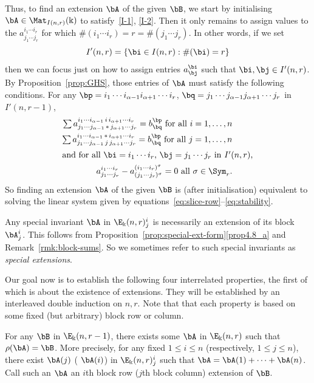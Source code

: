 Thus, to find an extension $\bA$ of the given $\bB$, we start by
initialising $\bA \in \Mat_{I(n,r)}(\Bbbk)$ to satisfy~\eqref{I-1},
\eqref{I-2}. Then it only remains to assign values to the $a^{i_1 \cdots
 i_r}_{j_1 \cdots j_r}$ for which $\#(i_1 \cdots i_r) = r = \#(j_1
\cdots j_r)$. In other words, if we set
\[
I'(n,r) = \{\bi \in I(n,r): \#(\bi) = r\}
\]
then we can focus just on how to assign entries $a^\bi_\bj$ such that
$\bi,\bj \in I'(n,r)$. By Proposition~\ref{prop:GHS}, those entries of
$\bA$ must satisfy the following conditions. For any $\bp = i_1
\cdots i_{\alpha-1} i_{\alpha+1} \cdots i_r$, $\bq = j_1 \cdots
j_{\alpha-1} j_{\alpha+1} \cdots j_r$ in $I'(n,r-1)$,
\begin{align}
\textstyle \sum a^{i_1\cdots i_{\alpha-1} \, i
 \, i_{\alpha+1}\cdots i_r}_{j_1\cdots j_{\alpha-1} \,*\,
 j_{\alpha+1}\cdots j_r} = b^\bp_\bq \text{ for all } i = 1, \dots,
n\label{eq:slice-row} \\
\textstyle \sum a^{i_1\cdots i_{\alpha-1} \,*\, i_{\alpha+1}\cdots
 i_r}_{j_1\cdots j_{\alpha-1} \, j \, j_{\alpha+1}\cdots j_r} =
b^\bp_\bq \text{ for all } j = 1, \dots,
n \label{eq:slice-col}\\
\intertext{and for all $\bi = i_1 \cdots i_r$,
 $\bj = j_1 \cdots j_r$ in $I'(n,r)$,}
a^{i_1 \cdots i_r}_{j_1 \cdots j_r} - a^{(i_1 \cdots
 i_r)^\sigma}_{(j_1 \cdots j_r)^\sigma} = 0 \text{ all } \sigma \in
\Sym_r \label{eq:stability}.
\end{align}
So finding an extension $\bA$ of the given $\bB$ is (after
initialisation) equivalent to solving the linear system given by
equations~\eqref{eq:slice-row}--\eqref{eq:stability}.

Any special invariant $\bA$ in $\E_\Bbbk(n,r)^i_j$ is necessarily an
extension of its block $\bA^i_j$. This follows from Proposition~\ref{prop:special-ext-form}\ref{prop4.8_a} and Remark~\ref{rmk:block-sums}. So we
sometimes refer to such special invariants as \emph{special
 extensions}.

Our goal now is to establish the following four interrelated
properties, the first of which is about the existence of
extensions. They will be established by an interleaved double
induction on $n,r$. Note that that each property is based on some
fixed (but arbitrary) block row or column.


\begin{property}\label{1}
 For any $\bB$ in $\E_\Bbbk(n,r-1)$, there exists some $\bA$ in
 $\E_\Bbbk(n,r)$ such that $\rho(\bA) = \bB$. More precisely, for any
 fixed $1\le i \le n$ \textup{(}respectively, $1 \le j \le
 n$\textup{)}, there exist $\bA(j)$ \textup{(}\resp
 $\bA(i)$\textup{)} in $\E_\Bbbk(n,r)^i_j$ such that $\bA = \bA(1) +
 \cdots + \bA(n)$. Call such an $\bA$ an $i$th block row
 \textup{(}\resp $j$th block column\textup{)} extension of $\bB$.
\end{property}

